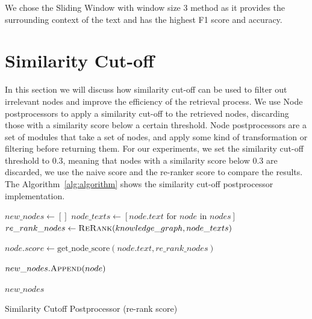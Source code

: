 We chose the Sliding Window with window size 3 method as it provides the surrounding context of the text and has the highest F1 score and accuracy.

\section{Similarity Cut-off}\label{sec:similar-cut-off}
In this section we will discuss how similarity cut-off can be used to filter out irrelevant nodes and improve the efficiency of the retrieval process.
We use Node postprocessors to apply a similarity cut-off to the retrieved nodes, discarding those with a similarity score below a certain threshold.
Node postprocessors are a set of modules that take a set of nodes, and apply some kind of transformation or filtering before returning them.
For our experiments, we set the similarity cut-off threshold to 0.3, meaning that nodes with a similarity score below 0.3 are discarded, we use the naive score and the re-ranker score to compare the results.
The Algorithm~\ref{alg:algorithm} shows the similarity cut-off postprocessor implementation.
\begin{algorithm}
    \begin{algorithmic}[1]
            \State $new\_nodes \gets []$
            \State $node\_texts \gets [node.text \text{ for } node \text{ in } nodes]$
            \State $re\_rank\_nodes \gets \textsc{ReRank}(knowledge\_graph, node\_texts)$

                \State $node.score \gets \text{get\_node\_score}(node.text, re\_rank\_nodes)$

                    \State $new\_nodes.\textsc{Append}(node)$
                \EndIf
            \EndFor

            \State \Return $new\_nodes$
        \EndProcedure
    \end{algorithmic}
    \caption{Similarity Cutoff Postprocessor (re-rank score)}\label{alg:algorithm}
\end{algorithm}


